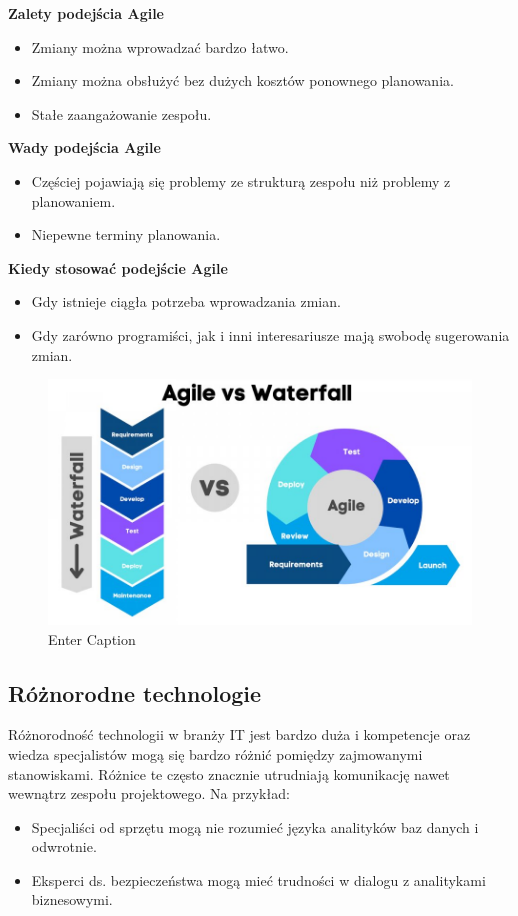 \textbf{Zalety podejścia Agile}
\begin{itemize}
    \item Zmiany można wprowadzać bardzo łatwo.
    \item Zmiany można obsłużyć bez dużych kosztów ponownego planowania.
    \item Stałe zaangażowanie zespołu.
\end{itemize}

\textbf{Wady podejścia Agile}
\begin{itemize}
    \item Częściej pojawiają się problemy ze strukturą zespołu niż problemy z planowaniem.
    \item Niepewne terminy planowania.
\end{itemize}

\textbf{Kiedy stosować podejście Agile}
\begin{itemize}
    \item Gdy istnieje ciągła potrzeba wprowadzania zmian.
    \item Gdy zarówno programiści, jak i inni interesariusze mają swobodę sugerowania zmian.\autocite{arora2016analysis}
\end{itemize}

\begin{figure}
    \centering
    \includegraphics[width=0.5\linewidth]{img/waterfall_agile.png}
    \caption{Enter Caption}
\end{figure}

\subsection{Różnorodne technologie}
Różnorodność technologii w branży IT jest bardzo duża i kompetencje oraz wiedza specjalistów mogą się bardzo różnić pomiędzy zajmowanymi stanowiskami. 
Różnice te często znacznie utrudniają komunikację nawet wewnątrz zespołu projektowego. Na przykład:
\begin{itemize}
    \item Specjaliści od sprzętu mogą nie rozumieć języka analityków baz danych i odwrotnie.
    \item Eksperci ds. bezpieczeństwa mogą mieć trudności w dialogu z analitykami biznesowymi.
\end{itemize}


